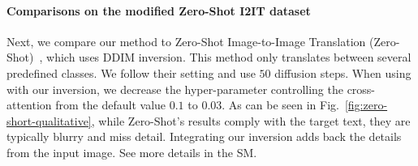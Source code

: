 
\vspace{-0.3cm}
\paragraph{Comparisons on the modified Zero-Shot I2IT dataset}
Next, we compare our method to Zero-Shot Image-to-Image Translation (Zero-Shot)~\cite{Parmar23}, which uses DDIM inversion.
This method only translates between several predefined classes. We follow their setting and use $50$ diffusion steps. When using with our inversion, we decrease the hyper-parameter controlling the cross-attention from the default value $0.1$ to $0.03$. As can be seen in Fig.~\ref{fig:zero-short-qualitative}, while Zero-Shot's results comply with the target text, they are typically blurry and miss detail. Integrating our inversion adds back the details from the input image. See more details in the SM.%



